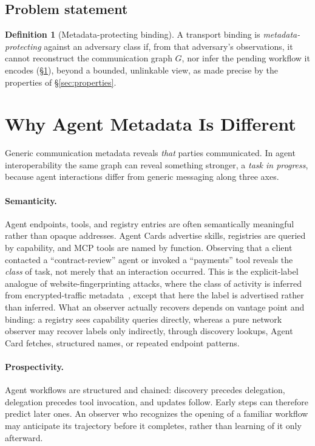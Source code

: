 \documentclass[10pt,twocolumn]{article}
\theoremstyle{definition}
\newtheorem{definition}{Definition}
\begin{document}
\subsection{Problem statement}
\begin{definition}[Metadata-protecting binding]\label{def:mpb}
A transport binding is \emph{metadata-protecting} against an adversary class if,
from that adversary's observations, it cannot reconstruct the communication graph
$G$, nor infer the pending workflow it encodes (\S\ref{sec:different}), beyond a
bounded, unlinkable view, as made precise by the properties of \S\ref{sec:properties}.
\end{definition}

\section{Why Agent Metadata Is Different}\label{sec:different}
Generic communication metadata reveals \emph{that} parties communicated. In agent
interoperability the same graph can reveal something stronger, a \emph{task in
progress}, because agent interactions differ from generic messaging along three
axes.

\paragraph{Semanticity.} Agent endpoints, tools, and registry entries are often
semantically meaningful rather than opaque addresses. Agent Cards advertise skills, registries are queried by capability, and
MCP tools are named by function. Observing that a client contacted a
``contract-review'' agent or invoked a ``payments'' tool reveals the \emph{class} of
task, not merely that an interaction occurred. This is the explicit-label analogue
of website-fingerprinting attacks, where the class of activity is inferred from
encrypted-traffic metadata~\citep{wfp}, except that here the label is advertised
rather than inferred. What an observer actually recovers depends on vantage point
and binding: a registry sees capability queries directly, whereas a pure network
observer may recover labels only indirectly, through discovery lookups, Agent Card
fetches, structured names, or repeated endpoint patterns.

\paragraph{Prospectivity.} Agent workflows are structured and chained: discovery
precedes delegation, delegation precedes tool invocation, and updates follow. Early
steps can therefore predict later ones. An observer who recognizes the opening of a
familiar workflow may anticipate its trajectory before it completes, rather than
learning of it only afterward.
\end{document}
